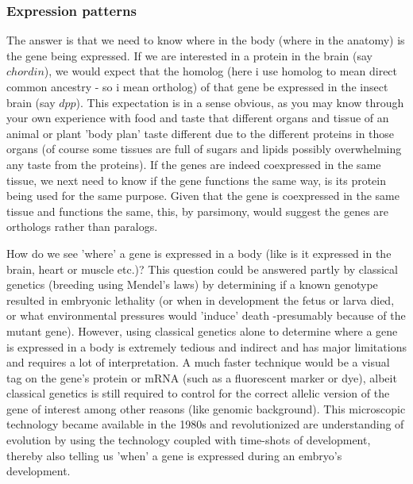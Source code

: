 \subsubsection{Expression patterns}
The answer is that we need to know where in the body (where in the anatomy) is the gene being expressed.  If we are interested in a protein in the brain (say $chordin$), we would expect that the homolog (here i use homolog to mean direct common ancestry - so i mean ortholog) of that gene be expressed in the insect brain (say $dpp$).  This expectation is in a sense obvious, as you may know through your own experience with food and taste that different organs and tissue of an animal or plant 'body plan' taste different due to the different proteins in those organs (of course some tissues are full of sugars and lipids possibly overwhelming any taste from the proteins).  If the genes are indeed coexpressed in the same tissue, we next need to know if the gene functions the same way, is its protein being used for the same purpose.  Given that the gene is coexpressed in the same tissue and functions the same, this, by parsimony, would suggest the genes are orthologs rather than paralogs.

How do we see 'where' a gene is expressed in a body (like is it expressed in the brain, heart or muscle etc.)?  This question could be answered partly by classical genetics (breeding using Mendel's laws) by determining if a known genotype resulted in embryonic lethality (or when in development the fetus or larva died, or what environmental pressures would 'induce' death -presumably because of the mutant gene).  However, using classical genetics alone to determine where a gene is expressed in a body is extremely tedious and indirect and has major limitations and requires a lot of interpretation.  A much faster technique would be a visual tag on the gene's protein or mRNA (such as a fluorescent marker or dye), albeit classical genetics is still required to control for the correct allelic version of the gene of interest among other reasons (like genomic background).  This microscopic technology became available in the 1980s and revolutionized are understanding of evolution by using the technology coupled with time-shots of development, thereby also telling us 'when' a gene is expressed during an embryo's development.

